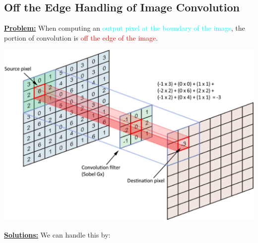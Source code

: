 \documentclass{book}
\begin{document}
\subsection{Off the Edge Handling of Image Convolution}
\underline{\textbf{Problem:}} When computing an \textcolor{cyan}{output pixel at the boundary of the imags}, the portion of convolution is \textcolor{red}{off the edge of the image}.\\
\begin{center}
    \includegraphics[scale=0.24]{chapter 8/ch8_figure9.jpeg}
\end{center}
\newpage
\underline{\textbf{Solutions:}} We can handle this by:
\end{document}
